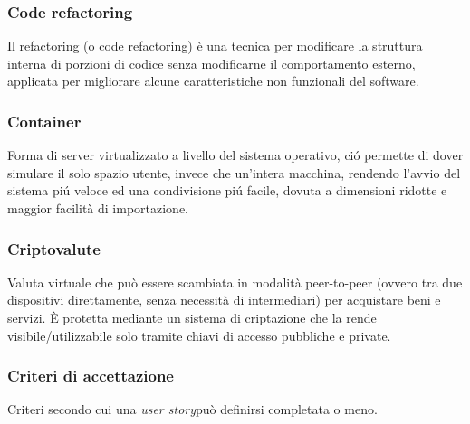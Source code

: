 \subsubsection*{Code refactoring}
Il refactoring (o code refactoring) è una tecnica per modificare la struttura interna di porzioni di codice senza modificarne il comportamento esterno, applicata per migliorare alcune caratteristiche non funzionali del software.
\subsubsection*{Container}
Forma di server virtualizzato a livello del sistema operativo, ció permette di dover simulare il solo spazio utente, invece che un’intera macchina, rendendo l’avvio del sistema piú veloce ed una condivisione piú facile, dovuta a dimensioni ridotte e maggior facilità di importazione.
\subsubsection*{Criptovalute}
Valuta virtuale che può essere scambiata in modalità peer-to-peer (ovvero tra due dispositivi direttamente, senza necessità di intermediari) per acquistare beni e servizi. È protetta mediante un sistema di criptazione che la rende visibile/utilizzabile solo tramite chiavi di accesso pubbliche e private.
\subsubsection*{Criteri di accettazione}
Criteri secondo cui una \textit{user story}\glo può definirsi completata o meno.
